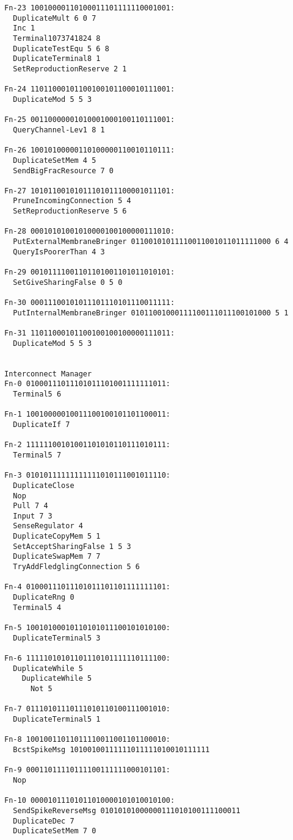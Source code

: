 \begin{verbatim}
Fn-23 10010000110100011101111110001001:
  DuplicateMult 6 0 7
  Inc 1
  Terminal1073741824 8
  DuplicateTestEqu 5 6 8
  DuplicateTerminal8 1
  SetReproductionReserve 2 1

Fn-24 11011000101100100101100010111001:
  DuplicateMod 5 5 3

Fn-25 00110000001010001000100110111001:
  QueryChannel-Lev1 8 1

Fn-26 10010100000110100000110010110111:
  DuplicateSetMem 4 5
  SendBigFracResource 7 0

Fn-27 10101100101011101011100001011101:
  PruneIncomingConnection 5 4
  SetReproductionReserve 5 6

Fn-28 00010101001010000100100000111010:
  PutExternalMembraneBringer 01100101011110011001011011111000 6 4
  QueryIsPoorerThan 4 3

Fn-29 00101111001101101001101011010101:
  SetGiveSharingFalse 0 5 0

Fn-30 00011100101011101110101110011111:
  PutInternalMembraneBringer 01011001000111100111011100101000 5 1

Fn-31 11011000101100100100100000111011:
  DuplicateMod 5 5 3


Interconnect Manager
Fn-0 01000111011101011101001111111011:
  Terminal5 6

Fn-1 10010000010011100100101101100011:
  DuplicateIf 7

Fn-2 11111100101001101010110111010111:
  Terminal5 7

Fn-3 01010111111111111010111001011110:
  DuplicateClose
  Nop
  Pull 7 4
  Input 7 3
  SenseRegulator 4
  DuplicateCopyMem 5 1
  SetAcceptSharingFalse 1 5 3
  DuplicateSwapMem 7 7
  TryAddFledglingConnection 5 6

Fn-4 01000111011101011101101111111101:
  DuplicateRng 0
  Terminal5 4

Fn-5 10010100010110101011100101010100:
  DuplicateTerminal5 3

Fn-6 11111010101101110101111110111100:
  DuplicateWhile 5
    DuplicateWhile 5
      Not 5

Fn-7 01110101110111010110100111001010:
  DuplicateTerminal5 1

Fn-8 10010011011011110011001101100010:
  BcstSpikeMsg 10100100111111011111010010111111

Fn-9 00011011110111100111111000101101:
  Nop

Fn-10 00001011101011010000101010010100:
  SendSpikeReverseMsg 01010101000000111010100111100011
  DuplicateDec 7
  DuplicateSetMem 7 0


\end{verbatim}
